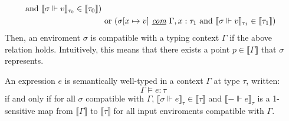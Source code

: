 \begin{definition}
\begin{equation}
\begin{normalsize}
\begin{aligned}[c]
        \text{ and } \llbracket \sigma \Vdash v \rrbracket_{\tau_0} \in
          \llbracket \tau_0 \rrbracket) \\
      & \text{ or } (\sigma[x \mapsto v] \textit{ \underline{com} } \Gamma, x :
      \tau_1 
        \text{ and } \llbracket \sigma \Vdash v \rrbracket_{\tau_1} \in
          \llbracket \tau_1 \rrbracket) \\
    \end{aligned}
    \end{normalsize}
  \end{equation}
  Then, an enviroment $\sigma$ is compatible with a typing context $\Gamma$ if
  the above relation holds. Intuitively, this means that there exists a point $p
  \in \llbracket \Gamma \rrbracket$ that $\sigma$ represents.
\end{definition}


\begin{definition}
  An expression $e$ is semantically well-typed in a context $\Gamma$ at type
  $\tau$, written:
  $$\Gamma \vDash e : \tau$$
  if and only if for all $\sigma$ compatible with $\Gamma$, $\llbracket
  \sigma \Vdash e \rrbracket_{\tau} \in \llbracket \tau \rrbracket$ and
  $\llbracket - \Vdash e \rrbracket_{\tau}$ is a 1-sensitive map from
  $\llbracket \Gamma \rrbracket$ to $\llbracket \tau \rrbracket$ for all input
  enviroments compatible with $\Gamma$.
\end{definition}

